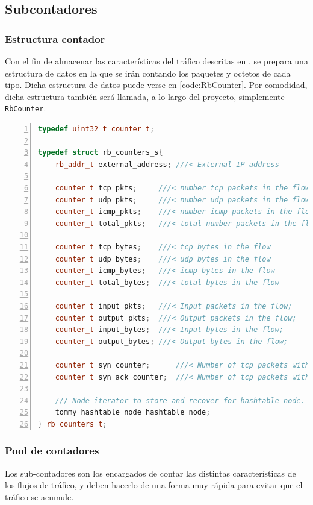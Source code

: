 \subsection{Subcontadores}
\subsubsection{Estructura contador}
Con el fin de almacenar las características del tráfico descritas en , se prepara una 
estructura de datos en la que se irán contando los paquetes y octetos de cada tipo. Dicha estructura de datos puede 
verse en \lstlistingname{} \ref{code:RbCounter}. Por comodidad, dicha estructura también será llamada, a lo largo del 
proyecto, simplemente \texttt{RbCounter}.

\begin{lstlisting}[language=C++,caption={Estructura de contadores por flujo}, breaklines=true, 
label=code:RbCounter,numbers=left,float=htbp]
typedef uint32_t counter_t;

typedef struct rb_counters_s{
    rb_addr_t external_address; ///< External IP address

    counter_t tcp_pkts;     ///< number tcp packets in the flow
    counter_t udp_pkts;     ///< number udp packets in the flow
    counter_t icmp_pkts;    ///< number icmp packets in the flow
    counter_t total_pkts;   ///< total number packets in the flow

    counter_t tcp_bytes;    ///< tcp bytes in the flow
    counter_t udp_bytes;    ///< udp bytes in the flow
    counter_t icmp_bytes;   ///< icmp bytes in the flow
    counter_t total_bytes;  ///< total bytes in the flow

    counter_t input_pkts;   ///< Input packets in the flow;
    counter_t output_pkts;  ///< Output packets in the flow;
    counter_t input_bytes;  ///< Input bytes in the flow;
    counter_t output_bytes; ///< Output bytes in the flow;

    counter_t syn_counter;      ///< Number of tcp packets with syn flag enabled
    counter_t syn_ack_counter;  ///< Number of tcp packets with syn+ack flags enabled

    /// Node iterator to store and recover for hashtable node.
    tommy_hashtable_node hashtable_node;
} rb_counters_t;
\end{lstlisting}

\subsubsection{Pool de contadores}
Los sub-contadores son los encargados de contar las distintas características de los flujos de tráfico, y deben 
hacerlo de una forma muy rápida para evitar que el tráfico se acumule.

